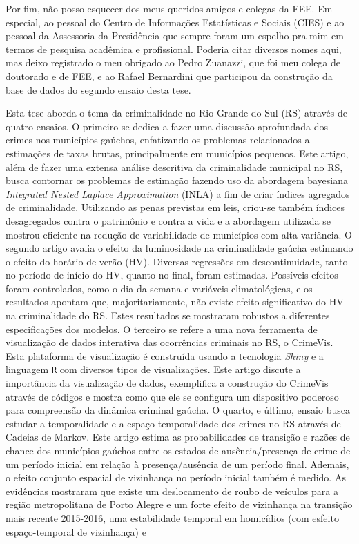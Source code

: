\documentclass[12pt,openright,oneside,a4paper,english,french,spanish]{abntex2}
\numberwithin{table}{section} %
\numberwithin{figure}{section} %
\begin{document}
\begin{agradecimentos}
Por fim, não posso esquecer dos meus queridos amigos e colegas da FEE. Em especial, ao pessoal do Centro de Informações Estatísticas e Sociais (CIES) e ao pessoal da Assessoria da Presidência que sempre foram um espelho pra mim em termos de pesquisa acadêmica e profissional. Poderia citar diversos nomes aqui, mas deixo registrado o meu obrigado ao Pedro Zuanazzi, que foi meu colega de doutorado e de FEE, e ao Rafael Bernardini que participou da construção da base de dados do segundo ensaio desta tese.

\end{agradecimentos}



\begin{resumo}

Esta tese aborda o tema da criminalidade no Rio Grande do Sul (RS) através de quatro ensaios. O primeiro se dedica a fazer uma discussão aprofundada dos crimes nos municípios gaúchos, enfatizando os problemas relacionados a estimações de taxas brutas, principalmente em municípios pequenos. Este artigo, além de fazer uma extensa análise descritiva da criminalidade municipal no RS, busca contornar os problemas de estimação fazendo uso da abordagem bayesiana \textit{Integrated Nested Laplace Approximation} (INLA) a fim de criar índices agregados de criminalidade. Utilizando as penas previstas em leis, criou-se também índices desagregados contra o patrimônio e contra a vida e a abordagem utilizada se mostrou eficiente na redução de variabilidade de municípios com alta variância. O segundo artigo avalia o efeito da luminosidade na criminalidade gaúcha estimando o efeito do horário de verão (HV). Diversas regressões em descontinuidade, tanto no período de início do HV, quanto no final, foram estimadas. Possíveis efeitos foram controlados, como o dia da semana e variáveis climatológicas, e os resultados apontam que, majoritariamente, não existe efeito significativo do HV na criminalidade do RS. Estes resultados se mostraram robustos a diferentes especificações dos modelos. O terceiro se refere a uma nova ferramenta de visualização de dados interativa das ocorrências criminais no RS, o CrimeVis. Esta plataforma de visualização é construída usando a tecnologia \textit{Shiny} e a linguagem \texttt{R} com diversos tipos de visualizações. Este artigo discute a importância da visualização de dados, exemplifica a construção do CrimeVis através de códigos e mostra como que ele se configura um dispositivo poderoso para compreensão da dinâmica criminal gaúcha. O quarto, e último, ensaio busca estudar a temporalidade e a espaço-temporalidade dos crimes no RS através de Cadeias de Markov. Este artigo estima as probabilidades de transição e razões de chance dos municípios gaúchos entre os estados de ausência/presença de crime de um período inicial em relação à presença/ausência de um período final. Ademais, o efeito conjunto espacial de vizinhança no período inicial também é medido. As evidências mostraram que existe um deslocamento de roubo de veículos para a região metropolitana de Porto Alegre e um forte efeito de vizinhança na transição mais recente 2015-2016, uma estabilidade temporal em homicídios (com esfeito espaço-temporal de vizinhança) e 
\end{resumo}
\end{document}
